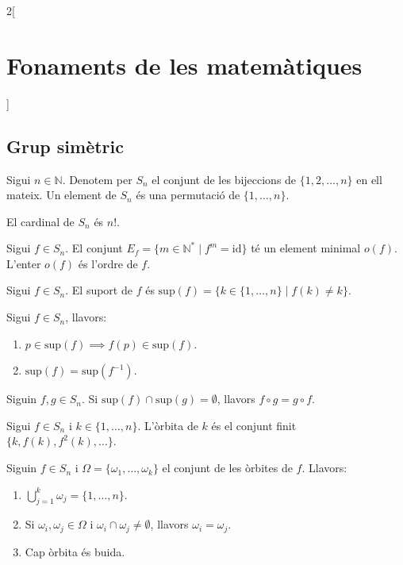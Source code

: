 \documentclass[../../../main.tex]{subfiles}
\begin{document}
\begin{multicols}{2}[\section{Fonaments de les matemàtiques}]
\subsection{Grup simètric}
\begin{definition}
Sigui $n\in\mathbb{N}$. Denotem per $S_n$ el conjunt de les bijeccions de $\{1,2,\ldots,n\}$ en ell mateix. Un element de $S_n$ és una permutació de $\{1,\ldots,n\}$.
\end{definition}
\begin{theorem}
El cardinal de $S_n$ és $n!$.
\end{theorem}
\begin{definition}
Sigui $f\in S_n$. El conjunt $E_f=\{m\in\mathbb{N}^*\mid f^m=\text{id}\}$ té un element minimal $o(f)$. L'enter $o(f)$ és l'ordre de $f$.
\end{definition}
\begin{definition}
Sigui $f\in S_n$. El suport de $f$ és $\text{sup}(f)=\{k\in\{1,\ldots,n\}\mid f(k)\ne k\}$.
\end{definition}
\begin{lemma}
Sigui $f\in S_n$, llavors:
\begin{enumerate}
    \item $p\in\text{sup}(f)\implies f(p)\in\text{sup}(f)$.
    \item $\text{sup}(f)=\text{sup}(f^{-1})$.
\end{enumerate}
\end{lemma}
\begin{lemma}
Siguin $f,g\in S_n$. Si $\text{sup}(f)\cap\text{sup}(g)=\emptyset$, llavors $f\circ g=g\circ f$.
\end{lemma}
\begin{definition}
Sigui $f\in S_n$ i $k\in\{1,\ldots,n\}$. L'òrbita de $k$ és el conjunt finit $\{k,f(k),f^2(k),\ldots\}$.
\end{definition}
\begin{theorem}
Siguin $f\in S_n$ i $\Omega=\{\omega_1,\ldots,\omega_k\}$ el conjunt de les òrbites de $f$. Llavors:
\begin{enumerate}
    \item $\bigcup_{j=1}^k \omega_j=\{1,\ldots,n\}$.
    \item Si $\omega_i,\omega_j\in\Omega$ i $\omega_i\cap\omega_j\ne\emptyset$, llavors $\omega_i=\omega_j$.
    \item Cap òrbita és buida.
\end{enumerate}
\end{theorem}
\begin{theorem}

\end{theorem}
\end{multicols}
\end{document}

